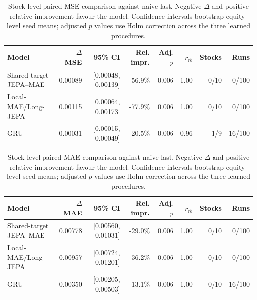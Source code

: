 \begin{table}[t]
\centering
\small
\caption{Stock-level paired MSE comparison against naive-last. Negative $\Delta$ and positive relative improvement favour the model. Confidence intervals bootstrap equity-level seed means; adjusted $p$ values use Holm correction across the three learned procedures.}
\label{tab:paired_mse_naive}
\begin{tabular}{lrrrrrrr}
\toprule
Model & $\Delta$MSE & 95\% CI & Rel. impr. & Adj. $p$ & $r_{rb}$ & Stocks & Runs \\
\midrule
Shared-target JEPA--MAE & 0.00089 & [0.00048, 0.00139] & -56.9\% & 0.006 & 1.00 & 0/10 & 0/100 \\
Local-MAE/Long-JEPA & 0.00115 & [0.00064, 0.00173] & -77.9\% & 0.006 & 1.00 & 0/10 & 0/100 \\
GRU & 0.00031 & [0.00015, 0.00049] & -20.5\% & 0.006 & 0.96 & 1/9 & 16/100 \\
\bottomrule
\end{tabular}
\end{table}

\begin{table}[t]
\centering
\small
\caption{Stock-level paired MAE comparison against naive-last. Negative $\Delta$ and positive relative improvement favour the model. Confidence intervals bootstrap equity-level seed means; adjusted $p$ values use Holm correction across the three learned procedures.}
\label{tab:paired_mae_naive}
\begin{tabular}{lrrrrrrr}
\toprule
Model & $\Delta$MAE & 95\% CI & Rel. impr. & Adj. $p$ & $r_{rb}$ & Stocks & Runs \\
\midrule
Shared-target JEPA--MAE & 0.00778 & [0.00560, 0.01031] & -29.0\% & 0.006 & 1.00 & 0/10 & 0/100 \\
Local-MAE/Long-JEPA & 0.00957 & [0.00724, 0.01201] & -36.2\% & 0.006 & 1.00 & 0/10 & 0/100 \\
GRU & 0.00350 & [0.00205, 0.00503] & -13.1\% & 0.006 & 1.00 & 0/10 & 16/100 \\
\bottomrule
\end{tabular}
\end{table}
